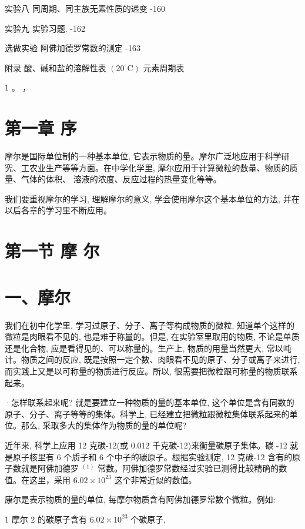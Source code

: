 \documentclass[10pt]{article}
\begin{document}
实验八 同周期、同主族无素性质的递变 -160

实验九 实验习题. -162

选做实验 阿佛加德罗常数的测定 -163

附录 酸、碱和盐的溶解性表 \(\left( {{20}^{ \circ }\mathrm{C}}\right)\) 元素周期表

1 。 ，

\section*{第一章 序}

摩尔是国际单位制的一种基本单位, 它表示物质的量。摩尔广泛地应用于科学研究、工农业生产等等方面。在中学化学里, 摩尔应用于计算微粒的数量、物质的质量、气体的体积、 溶液的浓度、反应过程的热量变化等等。

我们要重视摩尔的学习, 理解摩尔的意义, 学会使用摩尔这个基本单位的方法, 并在以后各章的学习里不断应用。

\section*{第一节 摩 尔}

\section*{一、摩尔}

我们在初中化学里, 学习过原子、分子、离子等构成物质的微粒, 知道单个这样的微粒是肉眼看不见的, 也是难于称量的。但是, 在实验室里取用的物质, 不论是单质还是化合物, 应是看得见的、可以称量的。生产上, 物质的用量当然更大, 常以吨计。物质之间的反应, 既是按照一定个数、肉眼看不见的原子、分子或离子来进行, 而实践上又是以可称量的物质进行反应。所以, 很需要把微粒跟可称量的物质联系起来。

·怎样联系起来呢? 就是要建立一种物质的量的基本单位, 这个单位是含有同数的原子、分子、离子等等的集体。科学上, 已经建立把微粒跟微粒集体联系起来的单位。那么, 采取多大的集体作为物质的量的单位呢?

近年来, 科学上应用 12 克碳-12(或 0.012 千克碳-12)来衡量碳原子集体。碳 -12 就是原子核里有 6 个质子和 6 个中子的碳原子。根据实验测定, 12 克碳-12 含有的原子数就是阿佛加德罗 \({}^{\left( 1\right) }\) 常数。阿佛加德罗常数经过实验已测得比较精确的数值。在这里，采用 \({6.02} \times {10}^{23}\) 这个非常近似的数值。

康尔是表示物质的量的单位, 每摩尔物质含有阿佛加德罗常数个微粒。例如:

1 摩尔 2 的碳原子含有 \({6.02} \times {10}^{23}\) 个碳原子,
\end{document}
